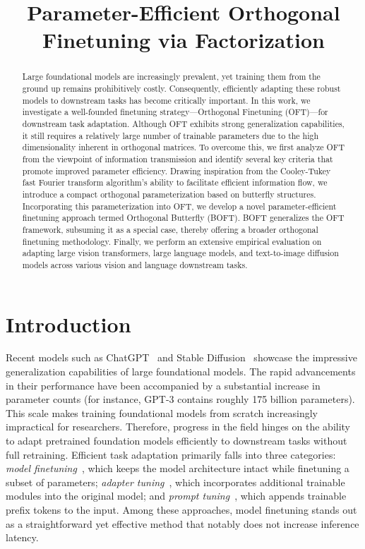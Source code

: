 \title{Parameter-Efficient Orthogonal Finetuning via Factorization}

\begin{abstract}
Large foundational models are increasingly prevalent, yet training them from the ground up remains prohibitively costly. Consequently, efficiently adapting these robust models to downstream tasks has become critically important. In this work, we investigate a well-founded finetuning strategy—Orthogonal Finetuning (OFT)—for downstream task adaptation. Although OFT exhibits strong generalization capabilities, it still requires a relatively large number of trainable parameters due to the high dimensionality inherent in orthogonal matrices. To overcome this, we first analyze OFT from the viewpoint of information transmission and identify several key criteria that promote improved parameter efficiency. Drawing inspiration from the Cooley-Tukey fast Fourier transform algorithm's ability to facilitate efficient information flow, we introduce a compact orthogonal parameterization based on butterfly structures. Incorporating this parameterization into OFT, we develop a novel parameter-efficient finetuning approach termed Orthogonal Butterfly (BOFT). BOFT generalizes the OFT framework, subsuming it as a special case, thereby offering a broader orthogonal finetuning methodology. Finally, we perform an extensive empirical evaluation on adapting large vision transformers, large language models, and text-to-image diffusion models across various vision and language downstream tasks.
\end{abstract}

\section{Introduction}

Recent models such as ChatGPT~\cite{brown2020language,chen2021evaluating} and Stable Diffusion~\cite{rombach2022high} showcase the impressive generalization capabilities of large foundational models. The rapid advancements in their performance have been accompanied by a substantial increase in parameter counts (for instance, GPT-3 contains roughly 175 billion parameters). This scale makes training foundational models from scratch increasingly impractical for researchers. Therefore, progress in the field hinges on the ability to adapt pretrained foundation models efficiently to downstream tasks without full retraining. Efficient task adaptation primarily falls into three categories: \emph{model finetuning}~\cite{hulora2022,zaken2022bitfit,guo2020parameter,raffel2020exploring,qiu2023controlling,zhang2022adaptive,chavan2023one}, which keeps the model architecture intact while finetuning a subset of parameters; \emph{adapter tuning}~\cite{rebuffi2017learning,houlsby2019parameter,pfeiffer2020adapterfusion,lin2020exploring,he2021towards}, which incorporates additional trainable modules into the original model; and \emph{prompt tuning}~\cite{li2021prefix,lester2021power}, which appends trainable prefix tokens to the input. Among these approaches, model finetuning stands out as a straightforward yet effective method that notably does not increase inference latency.


